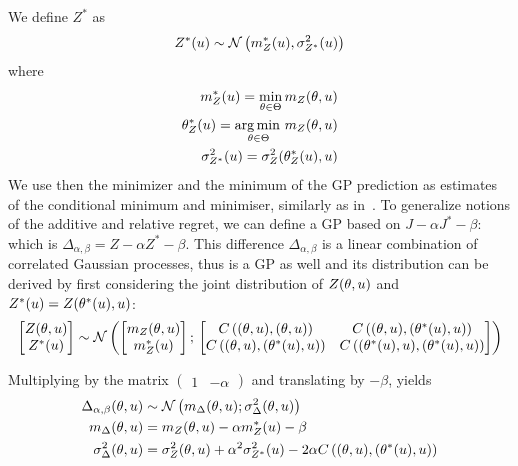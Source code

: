 \documentclass[../../Main_ManuscritThese.tex]{subfiles}
\begin{document}
We define $Z^*$ as
\begin{equation}
  Z^*(u) \sim \mathcal{N}\left(m^*_Z(u), \sigma^{2}_{Z^*}(u)\right)
\end{equation}
where
\begin{align}
  m^*_Z(u) = \min_{\theta\in\Theta} m_Z(\theta,u) \\
  \theta_Z^*(u)=\operatorname*{arg\,min \,}_{\theta\in\Theta} m_Z(\theta, u) \\
  \sigma^{2}_{Z^*}(u) = \sigma^{2}_Z(\theta^*_Z(u), u) 
\end{align}
We use then the minimizer and the minimum of the GP prediction as estimates of the conditional minimum and minimiser, similarly as in~\cite{ginsbourger_bayesian_2014}. %
To generalize notions of the additive and relative regret, we can define a GP based on $J - \alpha J^* - \beta$: which is $\Delta_{\alpha, \beta} = Z - \alpha Z^* - \beta$.
This difference $\Delta_{\alpha,\beta}$ is a linear combination of correlated Gaussian processes, thus is a GP as well and its distribution can be derived by first considering the joint distribution of $Z(\theta,u)$ and $Z^*(u) = Z(\theta^*(u), u)$:
\begin{equation}
  \begin{bmatrix}
    Z(\theta,u) \\
    Z^*(u)
  \end{bmatrix}
  \sim \mathcal{N}\left(
    \begin{bmatrix}
      m_Z(\theta,u) \\
      m_Z^*(u)
    \end{bmatrix}
    ;\,
    \begin{bmatrix}
      C\left((\theta,u),(\theta,u)\right) & C\left((\theta,u),(\theta^*(u),u)\right) \\
      C\left((\theta,u),(\theta^*(u),u)\right) & C\left((\theta^*(u),u),(\theta^*(u),u)\right)
    \end{bmatrix}
\right)
\end{equation}

Multiplying by the matrix $\begin{pmatrix}1 & -\alpha \end{pmatrix}$ and translating by $-\beta$, yields
\begin{align}
  \Delta_{\alpha,\beta}(\theta,u) &\sim \mathcal{N}\left(m_{\Delta}(\theta,u); \sigma^2_{\Delta}(\theta,u)\right)  \label{eq:delta_GP_ab}\\
  m_{\Delta}(\theta,u) &= m_Z(\theta,u) - \alpha m_Z^*(u) - \beta \label{eq:mu_delta_GP_ab}\\
  \sigma^2_{\Delta}(\theta,u) &= \sigma_Z^2(\theta,u) + \alpha^2 \sigma_{Z^*}^2(u) - 2\alpha C\left((\theta,u),(\theta^*(u),u)\right) \label{eq:variance_delta_GP_ab}
\end{align}
\end{document}

